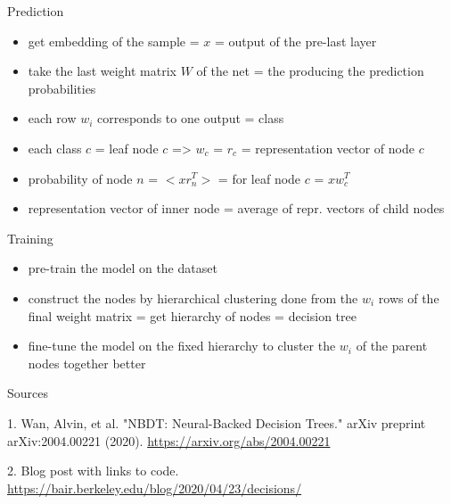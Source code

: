 \documentclass{beamer}
\begin{document}
\begin{frame}{Prediction}

\begin{itemize}
\item get embedding of the sample = $x$ = output of the pre-last layer
\item take the last weight matrix $W$ of the net = the producing the prediction probabilities
\item each row $w_i$ corresponds to one output = class
\item each class $c$ = leaf node $c$ => $w_c$ = $r_c$ = representation vector of node $c$  
\item probability of node $n$ = $<xr_n^T>$ = for leaf node $c$ = $xw_c^T$
\item representation vector of inner node = average of repr. vectors of child nodes
\end{itemize}

\end{frame}
\begin{frame}{Training}

\begin{itemize}
\item pre-train the model on the dataset
\item construct the nodes by hierarchical clustering done from the $w_i$ rows of the final weight matrix = get hierarchy of nodes = decision tree
\item fine-tune the model on the fixed hierarchy to cluster the $w_i$ of the parent nodes together better
\end{itemize}

\end{frame}


\begin{frame}{Sources}

\begin{thebibliography}{0}

   1. Wan, Alvin, et al. "NBDT: Neural-Backed Decision Trees." arXiv preprint arXiv:2004.00221 (2020). \url{https://arxiv.org/abs/2004.00221} 
  
   2. Blog post with links to code. \url{https://bair.berkeley.edu/blog/2020/04/23/decisions/}
  
\end{thebibliography}

\end{frame}

 
\end{document}

